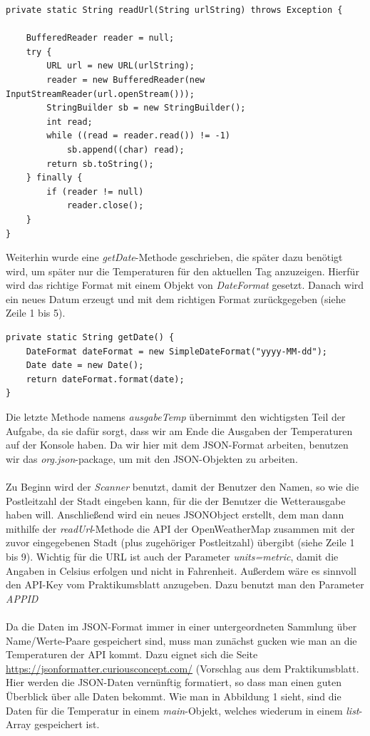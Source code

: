 \begin{lstlisting}[caption={readUrl-Methode}]
private static String readUrl(String urlString) throws Exception {

	BufferedReader reader = null;
	try {
		URL url = new URL(urlString);
		reader = new BufferedReader(new InputStreamReader(url.openStream()));
		StringBuilder sb = new StringBuilder();
		int read;
		while ((read = reader.read()) != -1)
			sb.append((char) read);
		return sb.toString();
	} finally {
		if (reader != null)
			reader.close();
	}
}
\end{lstlisting}

Weiterhin wurde eine \textit{getDate}-Methode geschrieben, die später dazu benötigt wird, um später nur die Temperaturen für den aktuellen Tag anzuzeigen. Hierfür wird das richtige Format mit einem Objekt von \textit{DateFormat} gesetzt. Danach wird ein neues Datum erzeugt und mit dem richtigen Format zurückgegeben (siehe Zeile 1 bis 5).

\begin{lstlisting}[caption={getDate-Methode}]
private static String getDate() {
	DateFormat dateFormat = new SimpleDateFormat("yyyy-MM-dd");
	Date date = new Date();
	return dateFormat.format(date);
}
\end{lstlisting}

Die letzte Methode namens \textit{ausgabeTemp} übernimmt den wichtigsten Teil der Aufgabe, da sie dafür sorgt, dass wir am Ende die Ausgaben der Temperaturen auf der Konsole haben. Da wir hier mit dem JSON-Format arbeiten, benutzen wir das \textit{org.json}-package, um mit den JSON-Objekten zu arbeiten.\cite{[5]} \\
\\
Zu Beginn wird der \textit{Scanner} benutzt, damit der Benutzer den Namen, so wie die Postleitzahl der Stadt eingeben kann, für die der Benutzer die Wetterausgabe haben will. Anschließend wird ein neues JSONObject erstellt, dem man dann mithilfe der \textit{readUrl}-Methode die API der OpenWeatherMap zusammen mit der zuvor eingegebenen Stadt (plus zugehöriger Postleitzahl) übergibt (siehe Zeile 1 bis 9). Wichtig für die URL ist auch der Parameter \textit{units=metric}, damit die Angaben in Celsius erfolgen und nicht in Fahrenheit. Außerdem wäre es sinnvoll den API-Key vom Praktikumsblatt anzugeben. Dazu benutzt man den Parameter \textit{APPID}\\
\\
Da die Daten im JSON-Format immer in einer untergeordneten Sammlung über Name/Werte-Paare gespeichert sind, muss man zunächst gucken wie man an die Temperaturen der API kommt. Dazu eignet sich die Seite \url{https://jsonformatter.curiousconcept.com/} (Vorschlag aus dem Praktikumsblatt. Hier werden die JSON-Daten vernünftig formatiert, so dass man einen guten Überblick über alle Daten bekommt. Wie man in Abbildung 1 sieht, sind die Daten für die Temperatur in einem \textit{main}-Objekt, welches wiederum in einem \textit{list}-Array gespeichert ist. 

